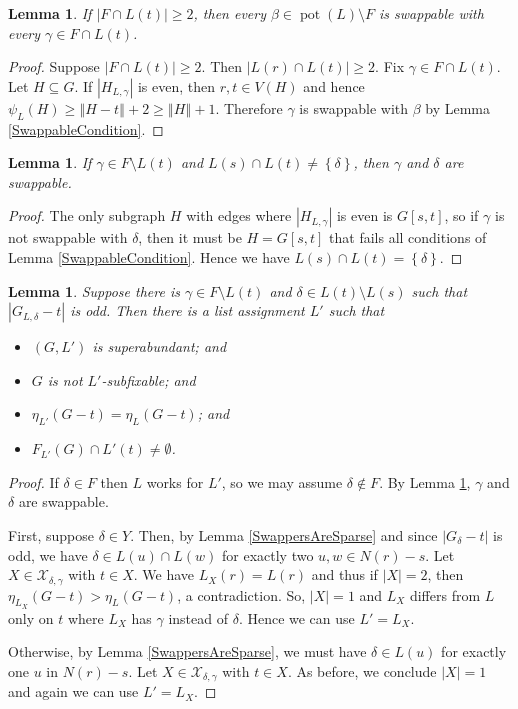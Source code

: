 \documentclass[12pt]{article}
\theoremstyle{plain}
\newtheorem{lem}[thm]{Lemma}
\theoremstyle{definition}
\theoremstyle{remark}
\newcommand{\fancy}[1]{\mathcal{#1}}
\newcommand{\set}[1]{\left\{ #1 \right\}}
\newcommand{\card}[1]{\left|#1\right|}
\newcommand{\size}[1]{\left\Vert#1\right\Vert}
\newcommand{\pot}{\operatorname{pot}}
\def\X{\fancy{X}}
\begin{document}
	\begin{lem}\label{FIntersectingLt}
		If $\card{F \cap L(t)} \ge 2$, then every $\beta \in \pot(L) \setminus F$ is swappable with every $\gamma \in F \cap L(t)$.
	\end{lem}
	\begin{proof}
		Suppose $\card{F \cap L(t)} \ge 2$.  Then $\card{L(r) \cap L(t)} \ge 2$.  Fix $\gamma \in F \cap L(t)$. Let $H \subseteq G$.  If $\card{H_{L, \gamma}}$ is even, then $r, t \in V(H)$ and hence $\psi_L(H) \ge \size{H-t} + 2 \ge \size{H} + 1$.  Therefore $\gamma$ is swappable with $\beta$ by Lemma \ref{SwappableCondition}.
	\end{proof}
	
	\begin{lem}\label{SingleGammaMuchSwappage}
		If $\gamma \in F \setminus L(t)$ and $L(s) \cap L(t) \ne \set{\delta}$, then $\gamma$ and $\delta$ are swappable.
	\end{lem}
	\begin{proof}
			The only subgraph $H$ with edges where $\card{H_{L, \gamma}}$ is even is $G[s, t]$, so if $\gamma$ is not swappable with $\delta$, then it must be $H = G[s, t]$ that fails all conditions of Lemma \ref{SwappableCondition}.  Hence we have $L(s) \cap L(t) = \set{\delta}$.
	\end{proof}
	
	\begin{lem}\label{Odd_delta}
		Suppose there is $\gamma \in F \setminus L(t)$ and $\delta \in L(t) \setminus L(s)$ such that $\card{G_{L, \delta} - t}$ is odd.  Then there is a list assignment $L'$ such that
		\begin{itemize}
			\item $(G, L')$ is superabundant; and
			\item $G$ is not $L'$-subfixable; and
			\item $\eta_{L'}(G - t) = \eta_L(G-t)$; and
			\item $F_{L'}(G) \cap L'(t) \ne \emptyset$.
		\end{itemize}
	\end{lem}
	\begin{proof}
		If $\delta \in F$ then $L$ works for $L'$, so we may assume $\delta \not \in F$.  By Lemma \ref{SingleGammaMuchSwappage}, $\gamma$ and $\delta$ are swappable.
		
		First, suppose $\delta \in Y$. Then, by Lemma \ref{SwappersAreSparse} and since $\card{G_\delta - t}$ is odd, we have $\delta \in L(u) \cap L(w)$ for exactly two $u,w \in N(r) - s$.   Let $X \in \X_{\delta,\gamma}$ with $t \in X$.  We have $L_X(r) = L(r)$ and thus if $|X| = 2$, then $\eta_{L_X}(G - t) > \eta_L(G - t)$, a contradiction.  So, $|X| = 1$ and $L_X$ differs from $L$ only on $t$ where $L_X$ has $\gamma$ instead of $\delta$.  Hence we can use $L' = L_X$.
		
		Otherwise, by Lemma \ref{SwappersAreSparse}, we must have $\delta \in L(u)$ for exactly one $u$ in $N(r) - s$.  Let $X \in \X_{\delta,\gamma}$ with $t \in X$. As before, we conclude $|X| = 1$ and again we can use $L' = L_X$.
	\end{proof}
	
\end{document}
